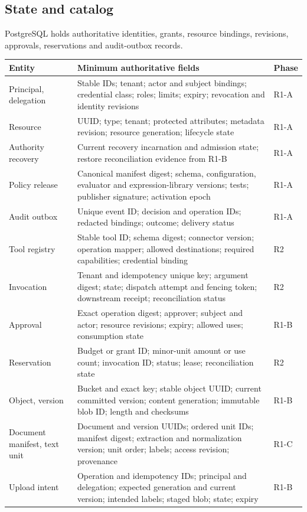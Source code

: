 \subsection{State and catalog}
PostgreSQL holds authoritative identities, grants, resource bindings, revisions, approvals, reservations and audit-outbox records.
\begin{longtable}{@{}P{0.20\textwidth}P{0.62\textwidth}P{0.08\textwidth}@{}}
\toprule Entity & Minimum authoritative fields & Phase\\\midrule\endhead
Principal, delegation & Stable IDs; tenant; actor and subject bindings; credential class; roles; limits; expiry; revocation and identity revisions & R1-A\\
Resource & UUID; type; tenant; protected attributes; metadata revision; resource generation; lifecycle state & R1-A\\
Authority recovery & Current recovery incarnation and admission state; restore reconciliation evidence from R1-B & R1-A\\
Policy release & Canonical manifest digest; schema, configuration, evaluator and expression-library versions; tests; publisher signature; activation epoch & R1-A\\
Audit outbox & Unique event ID; decision and operation IDs; redacted bindings; outcome; delivery status & R1-A\\
Tool registry & Stable tool ID; schema digest; connector version; operation mapper; allowed destinations; required capabilities; credential binding & R2\\
Invocation & Tenant and idempotency unique key; argument digest; state; dispatch attempt and fencing token; downstream receipt; reconciliation status & R2\\
Approval & Exact operation digest; approver; subject and actor; resource revisions; expiry; allowed uses; consumption state & R1-B\\
Reservation & Budget or grant ID; minor-unit amount or use count; invocation ID; status; lease; reconciliation state & R2\\
Object, version & Bucket and exact key; stable object UUID; current committed version; content generation; immutable blob ID; length and checksums & R1-B\\
Document manifest, text unit & Document and version UUIDs; ordered unit IDs; manifest digest; extraction and normalization version; unit order; labels; access revision; provenance & R1-C\\
Upload intent & Operation and idempotency IDs; principal and delegation; expected generation and current version; intended labels; staged blob; state; expiry & R1-B\\

\end{longtable}
